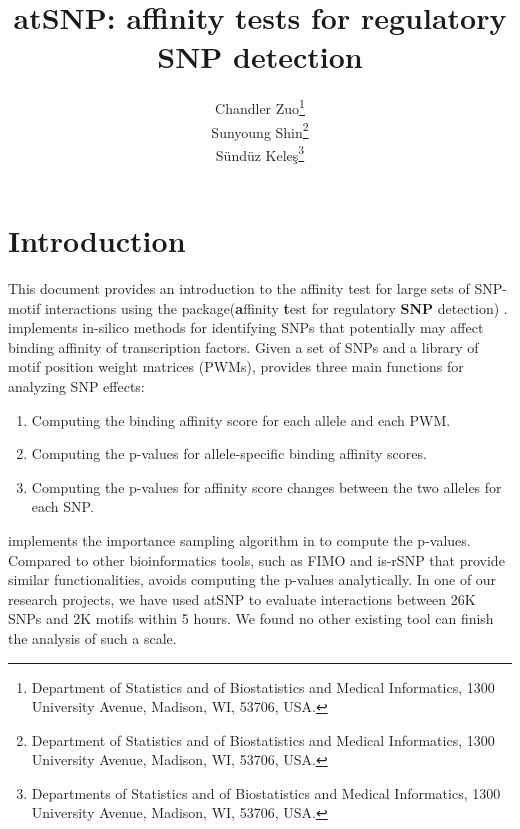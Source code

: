 \documentclass[a4paper,10pt]{article}
\title{atSNP: affinity tests for regulatory SNP detection}
\author{Chandler Zuo\footnote{Department of Statistics and of Biostatistics and Medical Informatics, 1300 University Avenue, Madison, WI, 53706, USA.}\\
Sunyoung Shin\footnote{Department of Statistics and of Biostatistics and Medical Informatics, 1300 University Avenue, Madison, WI, 53706, USA.}  \\
S\"und\"uz Kele\c{s}\footnote{Departments of Statistics and of Biostatistics and Medical Informatics, 1300 University Avenue, Madison, WI, 53706, USA.}}
\date{}
\begin{document}
\maketitle

\tableofcontents

\section{Introduction}

This document provides an introduction to the affinity test for large sets of SNP-motif interactions using the  package(\textbf{a}ffinity \textbf{t}est for regulatory \textbf{SNP} detection) \cite{zuo15}.  implements in-silico methods for identifying SNPs that potentially may affect binding affinity of transcription factors. Given a set of SNPs and a library of motif position weight matrices (PWMs),  provides three main functions for analyzing SNP effects:


\begin{enumerate}
\item Computing the binding affinity score for each allele and each PWM.
\item Computing the p-values for allele-specific binding affinity scores.
\item Computing the p-values for affinity score changes between the two alleles for each SNP.
\end{enumerate}

 implements the importance sampling algorithm in \cite{isample} to compute the p-values. Compared to other bioinformatics tools, such as FIMO \cite{fimo} and is-rSNP \cite{is-rsnp} that provide similar functionalities,  avoids computing the p-values analytically. %
In one of our research projects, we have used atSNP to evaluate interactions between 26K SNPs and 2K motifs within 5 hours. We found no other existing tool can finish the analysis of such a scale.

\end{document}
